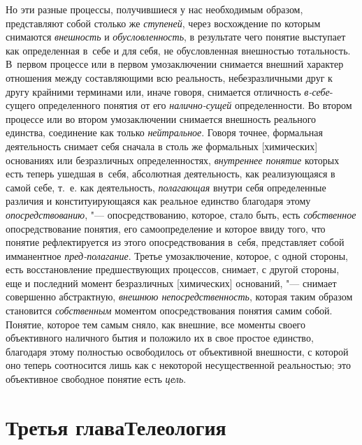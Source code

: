 Но эти разные процессы, получившиеся у нас необходимым
образом, представляют собой столько же
{\em ступеней}, через
восхождение по которым снимаются
{\em внешность} и
{\em обусловленность}, в
результате чего понятие выступает как определенная в~себе и для себя, не
обусловленная внешностью тотальность. В~первом процессе или в первом
умозаключении снимается внешний характер отношения между составляющими всю
реальность, небезразличными друг к другу крайними терминами или, иначе
говоря, снимается отличность
{\em в-себе}-сущего
определенного понятия от его
{\em налично-сущей}
определенности. Во втором процессе или во втором
умозаключении снимается внешность реального единства, соединение как только
{\em нейтральное}. Говоря
точнее, формальная деятельность снимает себя сначала в столь же формальных
[химических] основаниях или безразличных определенностях,
{\em внутреннее понятие}
которых есть теперь ушедшая в~себя, абсолютная деятельность,
как реализующаяся в самой себе, т.~е. как деятельность,
{\em полагающая} внутри
себя определенные различия и конституирующаяся как реальное единство
благодаря этому {\em опосредствованию},
"--- опосредствованию, которое, стало быть, есть
{\em собственное}
опосредствование понятия, его самоопределение и которое ввиду
того, что понятие рефлектируется из этого опосредствования в~себя,
представляет собой имманентное
{\em пред-полагание}.
Третье умозаключение, которое, с одной стороны, есть
восстановление предшествующих процессов, снимает, с другой стороны, еще и
последний момент безразличных [химических] оснований, "---
снимает совершенно абстрактную,
{\em внешнюю непосредственность},
которая таким образом становится
{\em собственным}
моментом опосредствования понятия самим собой. Понятие,
которое тем самым сняло, как внешние, все моменты своего объективного
наличного бытия и положило их в свое простое единство, благодаря этому
полностью освободилось от объективной внешности, с которой оно теперь
соотносится лишь как с некоторой несущественной реальностью; это
объективное свободное понятие есть
{\em цель}.

\chapter[Третья глава Телеология]{Третья глава\newline Телеология}

